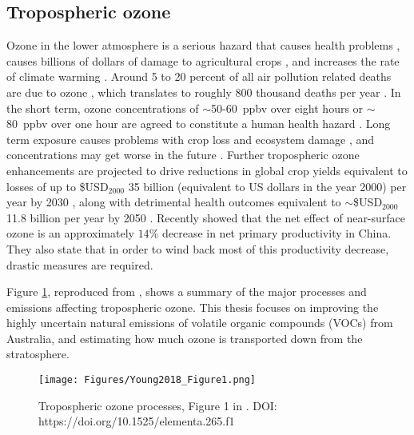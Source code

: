   
  \subsection{Tropospheric ozone}
    
    Ozone in the lower atmosphere is a serious hazard that causes health problems \parencite{Hsieh2013}, causes billions of dollars of damage to agricultural crops \parencite{Avnery2011,Yue2017}, and increases the rate of climate warming \parencite{IPCC_2013_chap8}.
    Around 5 to 20 percent of all air pollution related deaths are due to ozone \parencite{Monks2015}, which translates to roughly 800 thousand deaths per year \parencite{Lelieveld2013}.
    In the short term, ozone concentrations of $\sim$50-60~ppbv over eight hours or $\sim$80~ppbv over one hour are agreed to constitute a human health hazard \parencite{Ayers2006,Lelieveld2009}. 
    Long term exposure causes problems with crop loss and ecosystem damage \parencite{Emberson2003}, and concentrations may get worse in the future \parencite{Lelieveld2009, Stevenson2013}.
    Further tropospheric ozone enhancements are projected to drive reductions in global crop yields equivalent to losses of up to \$USD$_{2000}$ 35 billion (equivalent to US dollars in the year 2000) per year by 2030 \parencite{Avnery2011}, along with detrimental health outcomes equivalent to $\sim$\$USD$_{2000}$11.8 billion per year by 2050 \parencite{Selin2009}.
    Recently \textcite{Yue2017} showed that the net effect of near-surface ozone is an approximately $14\%$ decrease in net primary productivity in China.
    They also state that in order to wind back most of this productivity decrease, drastic measures are required. %
    
    Figure \ref{LR:O3:fig_YoungOzoneSummary}, reproduced from \textcite{Young2018}, shows a summary of the major processes and emissions affecting tropospheric ozone.
    This thesis focuses on improving the highly uncertain natural emissions of volatile organic compounds (VOCs) from Australia, and estimating how much ozone is transported down from the stratosphere.
    
    \begin{figure}
      \texttt{[image: Figures/Young2018\_Figure1.png]}
      \caption{%
        Tropospheric ozone processes, Figure 1 in \textcite{Young2018}.
        DOI: https://doi.org/10.1525/elementa.265.f1
      }
      \label{LR:O3:fig_YoungOzoneSummary}
    \end{figure}
  
